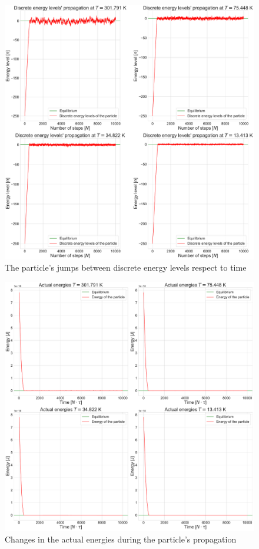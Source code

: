 \begin{figure}
    \centering
    \includegraphics[width=\textwidth]{images/discrete_levels.pdf}
    \caption{The particle's jumps between discrete energy levels respect to time}
    \label{fig:fig1}
\end{figure}

\begin{figure}
    \centering
    \includegraphics[width=\textwidth]{images/discrete_energies.pdf}
    \caption{Changes in the actual energies during the particle's propagation}
    \label{fig:fig2}
\end{figure}

